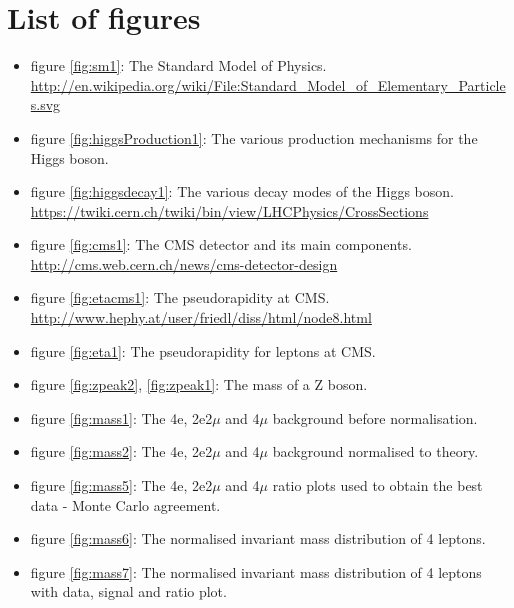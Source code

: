 \documentclass[a4paper,12pt]{article}
\begin{document}
\section{List of figures}
\begin{itemize}
	\item figure \ref{fig:sm1}: The Standard Model of Physics. 
	\newline \url{http://en.wikipedia.org/wiki/File:Standard_Model_of_Elementary_Particles.svg}
	
	\item figure \ref{fig:higgsProduction1}: The various production mechanisms for the Higgs boson.
	
	\item figure \ref{fig:higgsdecay1}: The various decay modes of the Higgs boson. 
	\newline \url{https://twiki.cern.ch/twiki/bin/view/LHCPhysics/CrossSections}
	
	\item figure \ref{fig:cms1}: The CMS detector and its main components.
	\newline \url{http://cms.web.cern.ch/news/cms-detector-design}
		
	\item figure \ref{fig:etacms1}: The pseudorapidity at CMS.
	\newline \url{http://www.hephy.at/user/friedl/diss/html/node8.html}
		
	\item figure \ref{fig:eta1}: The pseudorapidity for leptons at CMS.

	\item figure \ref{fig:zpeak2}, \ref{fig:zpeak1}: The mass of a Z boson.
	
	\item figure \ref{fig:mass1}: The 4e, 2e2$\mu$ and 4$\mu$ background before normalisation.
	
	\item figure \ref{fig:mass2}: The 4e, 2e2$\mu$ and 4$\mu$ background normalised to theory.

	\item figure \ref{fig:mass5}: The 4e, 2e2$\mu$ and 4$\mu$ ratio plots used to obtain the best data - Monte Carlo agreement.

	\item figure \ref{fig:mass6}: The normalised invariant mass distribution of 4 leptons.

	\item figure \ref{fig:mass7}: The normalised invariant mass distribution of 4 leptons with data, signal and ratio plot.
	

\end{itemize}
\end{document}
